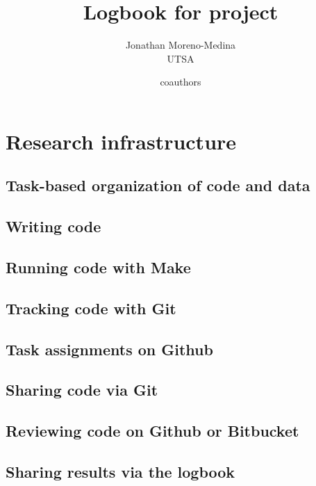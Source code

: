 \documentclass{report}
\title{Logbook for project}
\author{
Jonathan Moreno-Medina \\ {UTSA} \and
coauthors
}
\date{}
\numberwithin{equation}{section}
\numberwithin{figure}{section}
\numberwithin{table}{section}
\begin{document}
\maketitle

\renewcommand{\thechapter}{\Alph{chapter}}
\setcounter{tocdepth}{1}
\tableofcontents
\etocsettocstyle{}{} %

\chapter{Research infrastructure}


\section{Task-based organization of code and data} 
\section{Writing code} 
\section{Running code with Make} 
\section{Tracking code with Git} 

\section{Task assignments on Github} 
\section{Sharing code via Git} 
\section{Reviewing code on Github or Bitbucket} 
\section{Sharing results via the logbook} 
\end{document}
